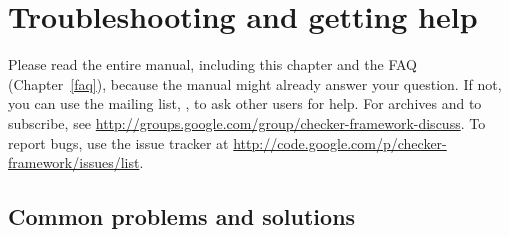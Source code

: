 \htmlhr
\chapter{Troubleshooting and getting help\label{troubleshooting}}

Please read the entire manual, including this chapter and the FAQ
(Chapter~\ref{faq}), because the manual might already answer your question.
If not, you can use the mailing list,
, to ask other users for
help.  For archives and to subscribe, see \url{http://groups.google.com/group/checker-framework-discuss}.
To report bugs, use the issue tracker at
\url{http://code.google.com/p/checker-framework/issues/list}.


\section{Common problems and solutions\label{common-problems}}


